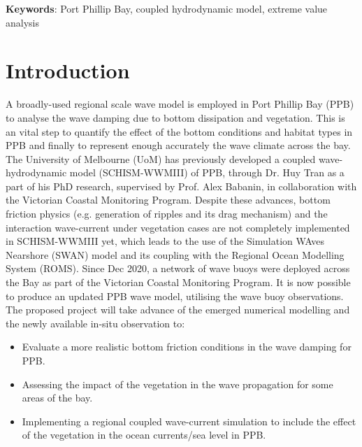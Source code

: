 \documentclass[12pt]{article}
\begin{document}
\noindent
\textbf{Keywords}: Port Phillip Bay, coupled hydrodynamic model, extreme value analysis


\newpage

\tableofcontents

\newpage

\listoffigures

\newpage

\hypersetup{
    colorlinks=true,
    linkcolor=blue,
    urlcolor=blue,
    }

\section{Introduction}

A broadly-used regional scale wave model is employed in Port Phillip Bay (PPB) to analyse the wave damping due to bottom dissipation and vegetation. This is an vital step to quantify the effect of the bottom conditions and habitat types in PPB and finally to represent enough accurately the wave climate across the bay. The University of Melbourne (UoM) has previously developed a coupled wave-hydrodynamic model (SCHISM-WWMIII) of PPB, through Dr. Huy Tran as a part of his PhD research, supervised by Prof. Alex Babanin, in collaboration with the Victorian Coastal Monitoring Program. Despite these advances, bottom friction physics (e.g. generation of ripples and its drag mechanism) and the interaction wave-current under vegetation cases are not completely implemented in SCHISM-WWMIII yet, which leads to the use of the Simulation WAves Nearshore (SWAN) model and its coupling with the Regional Ocean Modelling System (ROMS). Since Dec 2020, a network of wave buoys were deployed across the Bay as part of the Victorian Coastal Monitoring Program. It is now possible to produce an updated PPB wave model, utilising the wave buoy observations. The proposed project will take advance of the emerged numerical modelling and the newly available in-situ observation to:

\begin{itemize}
    \item Evaluate a more realistic bottom friction conditions in the wave damping for PPB.
    \item Assessing the impact of the vegetation in the wave propagation for some areas of the bay.
    \item Implementing a regional coupled wave-current simulation to include the effect of the vegetation in the ocean currents/sea level in PPB.
\end{itemize}
\end{document}

